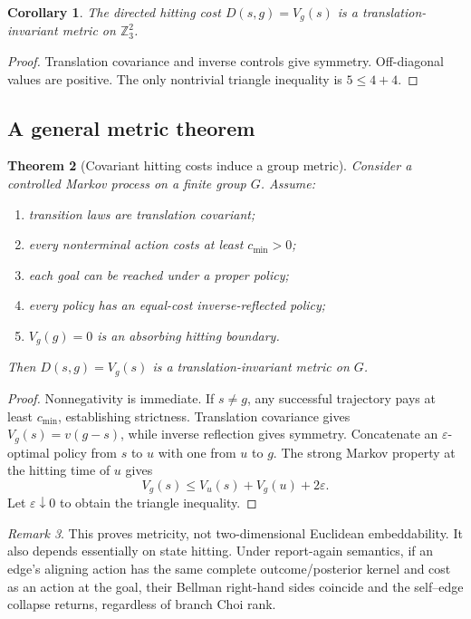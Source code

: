 \documentclass[11pt]{article}
\newtheorem{theorem}{Theorem}[section]
\newtheorem{corollary}[theorem]{Corollary}
\theoremstyle{definition}
\theoremstyle{remark}
\newtheorem{remark}[theorem]{Remark}
\newcommand{\Z}{\mathbb Z}
\begin{document}
\begin{corollary}
The directed hitting cost \(D(s,g)=V_g(s)\) is a
translation-invariant metric on \(\Z_3^2\).
\end{corollary}
\begin{proof}
Translation covariance and inverse controls give symmetry. Off-diagonal
values are positive. The only nontrivial triangle inequality is
\(5\le4+4\).
\end{proof}

\subsection{A general metric theorem}

\begin{theorem}[Covariant hitting costs induce a group metric]
\label{thm:metric}
Consider a controlled Markov process on a finite group \(G\). Assume:
\begin{enumerate}
\item transition laws are translation covariant;
\item every nonterminal action costs at least \(c_{\min}>0\);
\item each goal can be reached under a proper policy;
\item every policy has an equal-cost inverse-reflected policy;
\item \(V_g(g)=0\) is an absorbing hitting boundary.
\end{enumerate}
Then \(D(s,g)=V_g(s)\) is a translation-invariant metric on \(G\).
\end{theorem}
\begin{proof}
Nonnegativity is immediate. If \(s\ne g\), any successful trajectory pays at
least \(c_{\min}\), establishing strictness. Translation covariance gives
\(V_g(s)=v(g-s)\), while inverse reflection gives symmetry. Concatenate an
\(\varepsilon\)-optimal policy from \(s\) to \(u\) with one from \(u\) to
\(g\). The strong Markov property at the hitting time of \(u\) gives
\[
V_g(s)\le V_u(s)+V_g(u)+2\varepsilon.
\]
Let \(\varepsilon\downarrow0\) to obtain the triangle inequality.
\end{proof}

\begin{remark}
This proves metricity, not two-dimensional Euclidean embeddability. It also
depends essentially on state hitting. Under report-again semantics, if an
edge's aligning action has the same complete outcome/posterior kernel and cost
as an action at the goal, their Bellman right-hand sides coincide and the
self--edge collapse returns, regardless of branch Choi rank.
\end{remark}
\end{document}
